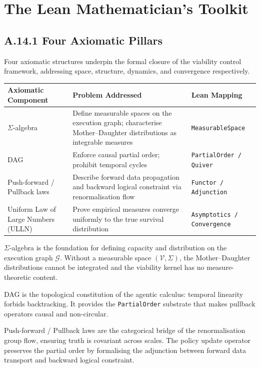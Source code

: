 \documentclass[11pt,a4paper]{article}
\theoremstyle{definition}
\theoremstyle{remark}
\begin{document}
\section{The Lean Mathematician's Toolkit}

\subsection{A.14.1 Four Axiomatic Pillars}

Four axiomatic structures underpin the formal closure of the viability control framework, addressing space, structure, dynamics, and convergence respectively.

\begin{table}[H]
\centering
\small
\begin{tabularx}{\textwidth}{l X l}
\toprule
\textbf{Axiomatic Component} & \textbf{Problem Addressed} & \textbf{Lean Mapping} \\
\midrule
$\Sigma$-algebra & Define measurable spaces on the execution graph; characterise Mother--Daughter distributions as integrable measures & \texttt{MeasurableSpace} \\
DAG & Enforce causal partial order; prohibit temporal cycles & \texttt{PartialOrder / Quiver} \\
Push-forward / Pullback laws & Describe forward data propagation and backward logical constraint via renormalisation flow & \texttt{Functor / Adjunction} \\
Uniform Law of Large Numbers (ULLN) & Prove empirical measures converge uniformly to the true survival distribution & \texttt{Asymptotics / Convergence} \\
\bottomrule
\end{tabularx}
\end{table}

$\Sigma$-algebra is the foundation for defining capacity and distribution on the execution graph $\mathcal{G}$. Without a measurable space $(\mathcal{V}, \Sigma)$, the Mother--Daughter distributions cannot be integrated and the viability kernel has no measure-theoretic content.

DAG is the topological constitution of the agentic calculus: temporal linearity forbids backtracking. It provides the \texttt{PartialOrder} substrate that makes pullback operators causal and non-circular.

Push-forward / Pullback laws are the categorical bridge of the renormalisation group flow, ensuring truth is covariant across scales. The policy update operator preserves the partial order by formalising the adjunction between forward data transport and backward logical constraint.
\end{document}
